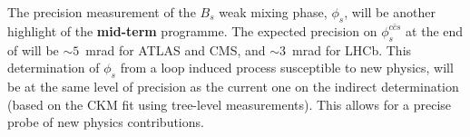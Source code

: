 The precision measurement of the $B_s$ weak mixing phase, $\phi_s$, will be another highlight of the {\bf mid-term} programme. The expected precision on $\phi_s^{c\bar{c}s}$ at the end of \HLLHC  will be $\sim 5$~mrad for ATLAS and CMS, and $\sim 3$~mrad for LHCb. 
This determination of $\phi_s$ from a loop induced process susceptible to new physics, will be at the same level of precision as the current one on the indirect determination (based on the CKM fit using tree-level measurements). This allows for a precise probe of new physics contributions.





